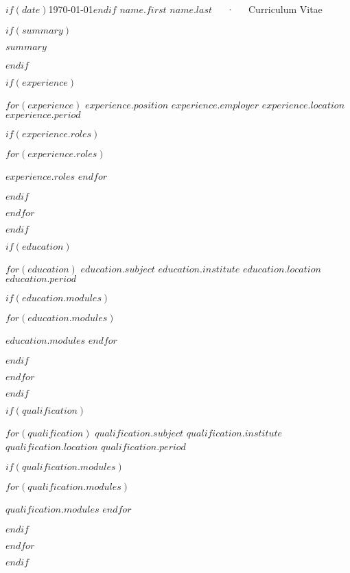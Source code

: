 \documentclass[11pt, a4paper]{awesome-cv}
\begin{document}
\makecvheader

\makecvfooter
  {$if(date)$\today$endif$}
  {$name.first$ $name.last$~~~·~~~Curriculum Vitae}
  {\thepage}



$if(summary)$
  \begin{cvparagraph}

    $summary$
  \end{cvparagraph}
$endif$

$if(experience)$
  \begin{cventries}

    $for(experience)$
      \cventry
      {$experience.position$}
      {$experience.employer$}
      {$experience.location$}
      {$experience.period$}
      {
        $if(experience.roles)$
          \begin{cvitems}
            $for(experience.roles)$
              \item {$experience.roles$}
            $endfor$
          \end{cvitems}
        $endif$
      }

    $endfor$
  \end{cventries}
$endif$

$if(education)$
  \begin{cventries}
    $for(education)$
      \cventry
      {$education.subject$}
      {$education.institute$}
      {$education.location$}
      {$education.period$}
      {
        $if(education.modules)$
          \begin{cvitems}
            $for(education.modules)$
              \item {$education.modules$}
            $endfor$
          \end{cvitems}
        $endif$
      }
    $endfor$
  \end{cventries}
$endif$

$if(qualification)$
  \begin{cventries}
    $for(qualification)$
      \cventry
      {$qualification.subject$}
      {$qualification.institute$}
      {$qualification.location$}
      {$qualification.period$}
      {
        $if(qualification.modules)$
          \begin{cvitems}
            $for(qualification.modules)$
              \item {$qualification.modules$}
            $endfor$
          \end{cvitems}
        $endif$
      }
    $endfor$
  \end{cventries}
$endif$
\end{document}
